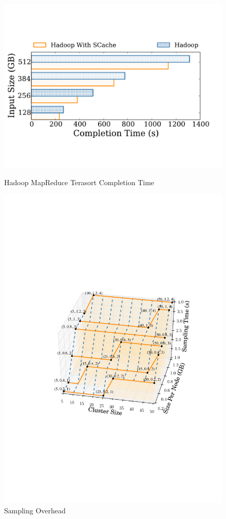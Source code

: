 \begin{figure}
    \centering
    \begin{minipage}{0.4\textwidth}
        \centering
        \includegraphics[width=\textwidth]{fig/hadoop_terasort_time} %
        \caption{\color{black}Hadoop MapReduce Terasort Completion Time}
		\label{fig:hadoop_terasort_time}
    \end{minipage}\hfill
    \begin{minipage}{0.4\textwidth}
        \centering
        \includegraphics[width=\textwidth]{fig/sampling} %
        \caption{Sampling Overhead}
		\label{fig:sampling}
    \end{minipage}
\end{figure}